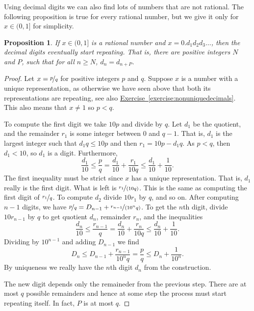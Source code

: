 \documentclass[12pt]{book}
\theoremstyle{plain}
\newtheorem{prop}[thm]{Proposition}
\theoremstyle{remark}
\theoremstyle{definition}
\theoremstyle{exercise}
\theoremstyle{example}
\newcommand{\exerciseref}[1]{\hyperref[#1]{Exercise~\ref*{#1}}}
\begin{document}
Using decimal digits we can also find lots of numbers that are not rational.
The following proposition is true for every
rational number, but we give it only for $x \in (0,1]$ for simplicity.

\begin{prop} \label{prop:rationaldecimal}
If $x \in (0,1]$ is a rational number and $x = 0.d_1d_2d_3\ldots$,
then the decimal digits eventually start repeating.  That is, there are 
positive integers $N$ and $P$, such that for all $n \geq N$, $d_n = d_{n+P}$.
\end{prop}

\begin{proof}
Let $x = \nicefrac{p}{q}$ for positive integers $p$ and $q$.
Suppose $x$ is a number with a unique representation, as
otherwise we have seen above that both its representations are repeating,
see also \exerciseref{exercise:nonuniquedecimals}.  This also means
that $x \not= 1$ so $p < q$.

To compute the first digit we take $10 p$ and divide by
$q$.  Let $d_1$ be the quotient, and the remainder $r_1$ is some integer
between 0 and $q-1$.  That is, $d_1$ is the largest integer
such that $d_1 q \leq 10p$ and then $r_1 = 10p - d_1q$.
As $p < q$, then $d_1 < 10$, so $d_1$ is a digit.
Furthermore,
\begin{equation*}
\frac{d_1}{10} \leq \frac{p}{q} =
\frac{d_1}{10} + \frac{r_1}{10q} \leq \frac{d_1}{10} +
\frac{1}{10} .
\end{equation*}
The first inequality must be strict since $x$ has a
unique representation.  That is, $d_1$ really is the first digit.
What is left is $\nicefrac{r_1}{(10q)}$.  This is the same as computing the
first digit of $\nicefrac{r_1}{q}$.
To compute $d_2$ divide $10 r_1$ by $q$, and so on.
After computing $n-1$ digits, we have
$\nicefrac{p}{q} = D_{n-1} + \nicefrac{r_{n-1}}{(10^{n} q)}$.
To get the $n$th digit,
divide $10 r_{n-1}$ by $q$
to get quotient $d_n$, remainder $r_n$, and the inequalities
\begin{equation*}
\frac{d_n}{10} \leq \frac{r_{n-1}}{q} =
\frac{d_n}{10} + \frac{r_n}{10q} \leq \frac{d_n}{10} +
\frac{1}{10} .
\end{equation*}
Dividing by $10^{n-1}$ and adding $D_{n-1}$ we find
\begin{equation*}
D_n \leq D_{n-1} + \frac{r_{n-1}}{10^{n} q} = \frac{p}{q} \leq D_n +
\frac{1}{10^n} .
\end{equation*}
By uniqueness we really have 
the $n$th digit $d_n$ from the construction.

The new digit depends only the remaineder from the previous
step.  There
are at most $q$ possible remainders
and hence at some step the process must start repeating itself.
In fact, $P$ is at most $q$.
\end{proof}
\end{document}
